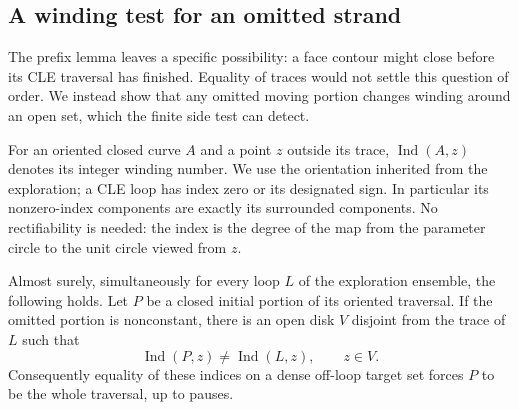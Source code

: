 \subsection{A winding test for an omitted strand}

The prefix lemma leaves a specific possibility: a face contour might
close before its CLE traversal has finished.  Equality of traces would
not settle this question of order.  We instead show that any omitted
moving portion changes winding around an open set, which the finite
side test can detect.

For an oriented closed curve $A$ and a point $z$ outside its trace,
$\operatorname{Ind}(A,z)$ denotes its integer winding number.  We use
the orientation inherited from the exploration; a CLE loop has index
zero or its designated sign.  In particular its nonzero-index components
are exactly its surrounded components.  No rectifiability is needed:
the index is the degree of the map from the parameter circle to the
unit circle viewed from $z$.

\begin{lemma}
\label{loop:strand}
Almost surely, simultaneously for every loop $L$ of the exploration
ensemble, the following holds.  Let $P$ be a closed initial portion of
its oriented traversal.  If the omitted portion is nonconstant, there
is an open disk $V$ disjoint from the trace of $L$ such that
\[
 \operatorname{Ind}(P,z)\ne\operatorname{Ind}(L,z),\qquad z\in V.
\]
Consequently equality of these indices on a dense off-loop target set
forces $P$ to be the whole traversal, up to pauses.
\end{lemma}

